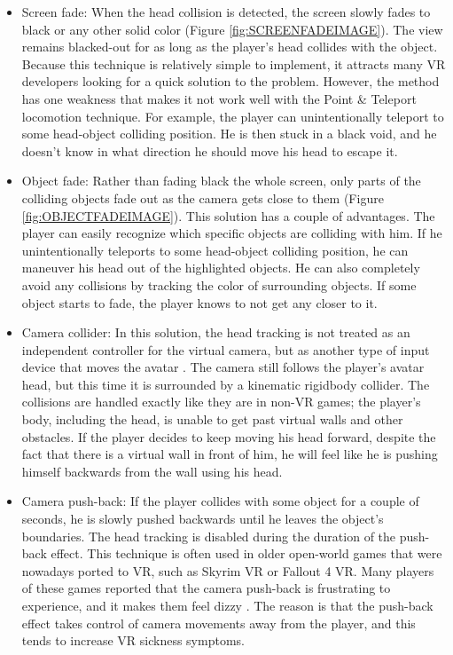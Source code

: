 \begin{itemize}
\item Screen fade: When the head collision is detected, the screen slowly fades to black or any other solid color (Figure \ref{fig:SCREENFADEIMAGE}). The view remains blacked-out for as long as the player's head collides with the object. Because this technique is relatively simple to implement, it attracts many VR developers looking for a quick solution to the problem. However, the method has one weakness that makes it not work well with the Point \& Teleport locomotion technique. For example, the player can unintentionally teleport to some head-object colliding position. He is then stuck in a black void, and he doesn't know in what direction he should move his head to escape it.

\item Object fade: Rather than fading black the whole screen, only parts of the colliding objects fade out as the camera gets close to them (Figure \ref{fig:OBJECTFADEIMAGE}). This solution has a couple of advantages. The player can easily recognize which specific objects are colliding with him. If he unintentionally teleports to some head-object colliding position, he can maneuver his head out of the highlighted objects. He can also completely avoid any collisions by tracking the color of surrounding objects. If some object starts to fade, the player knows to not get any closer to it.

\item Camera collider: In this solution, the head tracking is not treated as an independent controller for the virtual camera, but as another type of input device that moves the avatar \cite{CAMERACOLLIDER}. The camera still follows the player's avatar head, but this time it is surrounded by a kinematic rigidbody collider. The collisions are handled exactly like they are in non-VR games; the player's body, including the head, is unable to get past virtual walls and other obstacles. If the player decides to keep moving his head forward, despite the fact that there is a virtual wall in front of him, he will feel like he is pushing himself backwards from the wall using his head.

\item Camera push-back: If the player collides with some object for a couple of seconds, he is slowly pushed backwards until he leaves the object's boundaries. The head tracking is disabled during the duration of the push-back effect. This technique is often used in older open-world games that were nowadays ported to VR, such as Skyrim VR or Fallout 4 VR. Many players of these games reported that the camera push-back is frustrating to experience, and it makes them feel dizzy \cite{redditfallout}\cite{SKYRIMVRPUSHBACK}\cite{PUSHBACKFEEDBACK}. The reason is that the push-back effect takes control of camera movements away from the player, and this tends to increase VR sickness symptoms.
\end{itemize}

